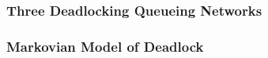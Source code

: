 \documentclass[xcolor={table}]{beamer}
\begin{document}
\begin{frame}
    \begin{figure}
    
    \end{figure}
\end{frame}


\begin{frame}
\frametitle{Three Deadlocking Queueing Networks}
\begin{figure}

\end{figure}
\end{frame}

\begin{frame}
    \frametitle{Markovian Model of Deadlock}
    \newline
\end{frame}
\end{document}
